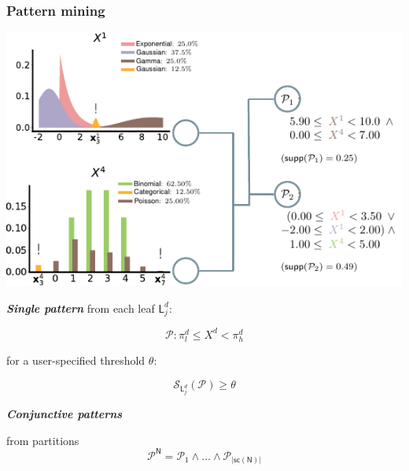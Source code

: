 \documentclass[xcolor={usenames,dvipsnames,svgnames}, compress, aspectratio=169, 11pt]{beamer}
\newcommand{\Node}{\mathsf{N}}
\newcommand{\Leaf}{\mathsf{L}}
\newcommand{\scope}{\mathsf{sc}}
\begin{document}
\begin{frame}[t, htt=bgrey2]
  \frametitle{Pattern mining}

  \large
  \begin{minipage}[t]{0.6\linewidth}
    \vspace{5pt}
    \includegraphics[width=.99\linewidth]{figures/abda-pattern-mining}
  \end{minipage}\hfill\begin{minipage}[t]{0.37\linewidth}
    \raggedright
    \vspace{10pt}

    \emph{\textbf{Single pattern}} from each leaf $\Leaf^d_{j}$:

    $$\mathcal{P}\colon \pi_{l}^{d}\leq X^{d}<\pi_{h}^{d}$$

    for a user-specified threshold $\theta$:

    $$\mathcal{S}_{\Leaf^d_{j}}(\mathcal{P}) \geq \theta$$

    \emph{\textbf{Conjunctive patterns}}\par from partitions
    $$\mathcal{P}^{\Node}=\mathcal{P}_{1}\wedge\ldots\wedge\mathcal{P}_{|\scope(\Node)|}$$

     
    
  \end{minipage}  
\end{frame}
\end{document}
